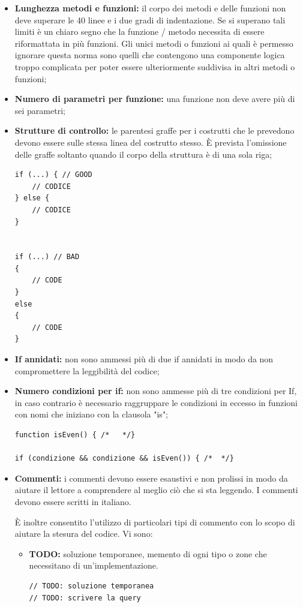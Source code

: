 \begin{itemize}
			\item \textbf{Lunghezza metodi e funzioni:} il corpo dei metodi e delle funzioni non deve superare le 40 linee e i due gradi di indentazione. Se si superano tali limiti è un chiaro segno che la funzione / metodo necessita di essere riformattata in più funzioni. Gli unici metodi o funzioni ai quali è permesso ignorare questa norma sono quelli che contengono una componente logica troppo complicata per poter essere ulteriormente suddivisa in altri metodi o funzioni;
			
			\item \textbf{Numero di parametri per funzione: } una funzione non deve avere più di sei parametri;
			
			\item \textbf{Strutture di controllo:} le parentesi graffe per i costrutti che le prevedono devono essere sulle stessa linea del costrutto stesso. È prevista l'omissione delle graffe soltanto quando il corpo della struttura è di una sola riga;
\begin{lstlisting}
if (...) { // GOOD
	// CODICE
} else {
	// CODICE
}


if (...) // BAD
{
 	// CODE
}
else 
{
	// CODE
}

\end{lstlisting}
			\item \textbf{If annidati:} non sono ammessi più di due if annidati in modo da non compromettere la leggibilità del codice;
			\item \textbf{Numero condizioni per if: } non sono ammesse più di tre condizioni per If, in caso contrario è necessario raggruppare le condizioni in eccesso in funzioni con nomi che iniziano con la clausola "is";
\begin{lstlisting}
function isEven() { /*   */}

if (condizione && condizione && isEven()) { /*  */}

\end{lstlisting}

			\item \textbf{Commenti:} i commenti devono essere esaustivi e non prolissi in modo da aiutare il lettore a comprendere al meglio ciò che si sta leggendo. I commenti devono essere scritti in italiano.
			
			È inoltre consentito l'utilizzo di particolari tipi di commento con lo scopo di aiutare la stesura del codice. Vi sono:
			\begin{itemize}
				\item \textbf{TODO:} soluzione temporanee, memento di ogni tipo o zone che necessitano di un'implementazione.
				\begin{lstlisting}
// TODO: soluzione temporanea
// TODO: scrivere la query
				\end{lstlisting}
				

\end{itemize}
\end{itemize}
